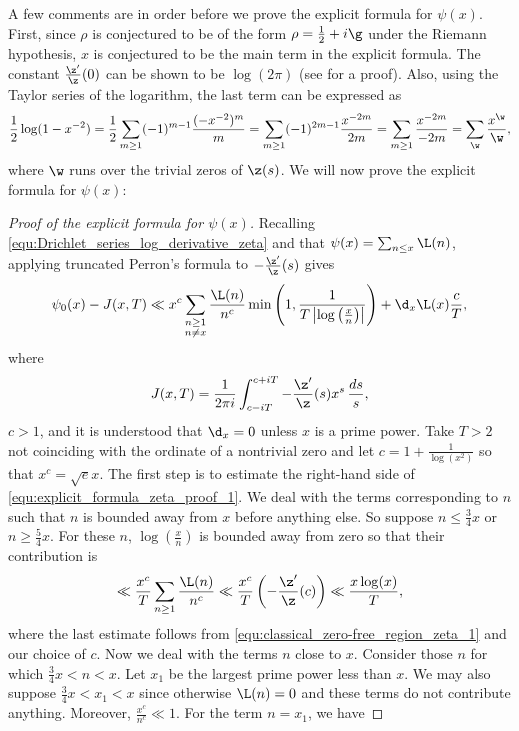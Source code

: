       A few comments are in order before we prove the explicit formula for $\psi(x)$. First, since $\rho$ is conjectured to be of the form $\rho = \frac{1}{2}+i\g$ under the Riemann hypothesis, $x$ is conjectured to be the main term in the explicit formula. The constant $\frac{\z'}{\z}(0)$ can be shown to be $\log(2\pi)$ (see \cite{davenport1980multiplicative} for a proof). Also, using the Taylor series of the logarithm, the last term can be expressed as
      \[
        \frac{1}{2}\log(1-x^{-2}) = \frac{1}{2}\sum_{m \ge 1}(-1)^{m-1}\frac{(-x^{-2})^{m}}{m} = \sum_{m \ge 1}(-1)^{2m-1}\frac{x^{-2m}}{2m} = \sum_{m \ge 1}\frac{x^{-2m}}{-2m} = \sum_{\w}\frac{x^{\w}}{\w},
      \]
      where $\w$ runs over the trivial zeros of $\z(s)$. We will now prove the explicit formula for $\psi(x)$:

      \begin{proof}[Proof of the explicit formula for $\psi(x)$]
        Recalling \cref{equ:Drichlet_series_log_derivative_zeta} and that $\psi(x) = \sum_{n \le x}\L(n)$, applying truncated Perron's formula to $-\frac{\z'}{\z}(s)$ gives
        \begin{equation}\label{equ:explicit_formula_zeta_proof_1}
          \psi_{0}(x)-J(x,T) \ll x^{c}\sum_{\substack{n \ge 1 \\ n \neq x}}\frac{\L(n)}{n^{c}}\min\left(1,\frac{1}{T\left|\log\left(\frac{x}{n}\right)\right|}\right)+\d_{x}\L(x)\frac{c}{T},
        \end{equation}
        where
        \[
          J(x,T) = \frac{1}{2\pi i}\int_{c-iT}^{c+iT}-\frac{\z'}{\z}(s)x^{s}\,\frac{ds}{s},
        \]
        $c > 1$, and it is understood that $\d_{x} = 0$ unless $x$ is a prime power. Take $T > 2$ not coinciding with the ordinate of a nontrivial zero and let $c = 1+\frac{1}{\log(x^{2})}$ so that $x^{c} = \sqrt{e}x$. The first step is to estimate the right-hand side of \cref{equ:explicit_formula_zeta_proof_1}. We deal with the terms corresponding to $n$ such that $n$ is bounded away from $x$ before anything else. So suppose $n \le \frac{3}{4}x$ or $n \ge \frac{5}{4}x$. For these $n$, $\log\left(\frac{x}{n}\right)$ is bounded away from zero so that their contribution is
        \begin{equation}\label{equ:explicit_formula_zeta_proof_2}
          \ll \frac{x^{c}}{T}\sum_{n \ge 1}\frac{\L(n)}{n^{c}} \ll \frac{x^{c}}{T}\left(-\frac{\z'}{\z}(c)\right) \ll \frac{x\log(x)}{T},
        \end{equation}
        where the last estimate follows from \cref{equ:classical_zero-free_region_zeta_1} and our choice of $c$. Now we deal with the terms $n$ close to $x$. Consider those $n$ for which $\frac{3}{4}x < n < x$. Let $x_{1}$ be the largest prime power less than $x$. We may also suppose $\frac{3}{4}x < x_{1} < x$ since otherwise $\L(n) = 0$ and these terms do not contribute anything. Moreover, $\frac{x^{c}}{n^{c}} \ll 1$. For the term $n = x_{1}$, we have

\end{proof}
